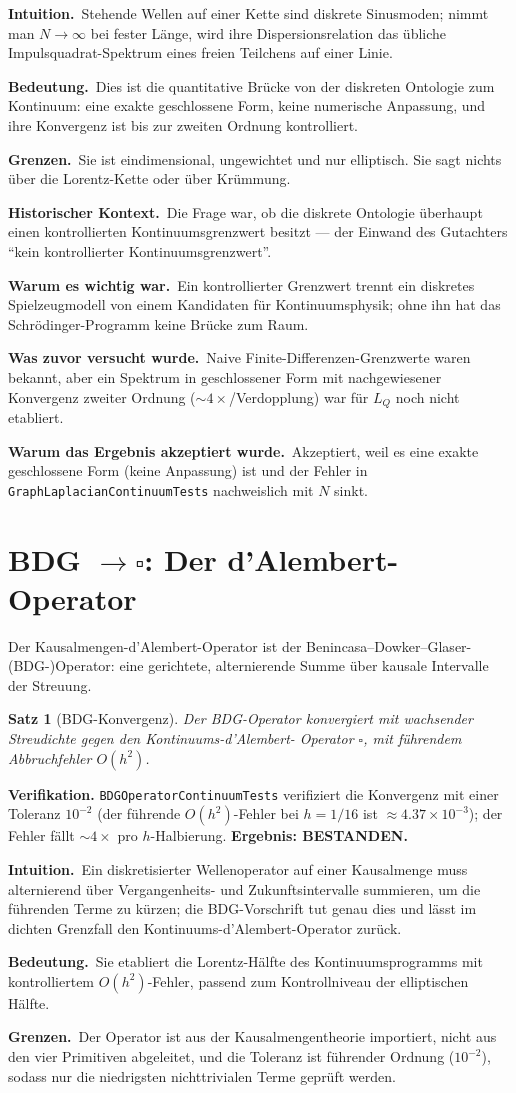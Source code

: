 \documentclass[10pt,twoside,openany]{book}
\newtheorem{theorem}{Satz}[chapter]
\newcommand{\theoremnotes}[3]{%
  \par\medskip\noindent
  \textbf{Intuition.}\ #1\par
  \textbf{Bedeutung.}\ #2\par
  \textbf{Grenzen.}\ #3\par}
\newcommand{\historynotes}[4]{%
  \par\smallskip\noindent
  \textbf{Historischer Kontext.}\ #1\par
  \textbf{Warum es wichtig war.}\ #2\par
  \textbf{Was zuvor versucht wurde.}\ #3\par
  \textbf{Warum das Ergebnis akzeptiert wurde.}\ #4\par}
\begin{document}
\theoremnotes
{Stehende Wellen auf einer Kette sind diskrete Sinusmoden; nimmt man $N\to\infty$ bei
fester Länge, wird ihre Dispersionsrelation das übliche Impulsquadrat-Spektrum eines
freien Teilchens auf einer Linie.}
{Dies ist die quantitative Brücke von der diskreten Ontologie zum Kontinuum: eine exakte
geschlossene Form, keine numerische Anpassung, und ihre Konvergenz ist bis zur zweiten
Ordnung kontrolliert.}
{Sie ist eindimensional, ungewichtet und nur elliptisch. Sie sagt nichts über die
Lorentz-Kette oder über Krümmung.}

\historynotes
{Die Frage war, ob die diskrete Ontologie überhaupt einen kontrollierten
Kontinuumsgrenzwert besitzt --- der Einwand des Gutachters ``kein kontrollierter
Kontinuumsgrenzwert''.}
{Ein kontrollierter Grenzwert trennt ein diskretes Spielzeugmodell von einem Kandidaten
für Kontinuumsphysik; ohne ihn hat das Schr\"odinger-Programm keine Brücke zum Raum.}
{Naive Finite-Differenzen-Grenzwerte waren bekannt, aber ein Spektrum in geschlossener
Form mit nachgewiesener Konvergenz zweiter Ordnung ($\sim4\times$/Verdopplung) war für
$L_Q$ noch nicht etabliert.}
{Akzeptiert, weil es eine exakte geschlossene Form (keine Anpassung) ist und der Fehler in
\texttt{GraphLaplacianContinuumTests} nachweislich mit $N$ sinkt.}

\section{BDG $\to \square$: Der d'Alembert-Operator}
\label{ch:dalembertian}

Der Kausalmengen-d'Alembert-Operator ist der Benincasa--Dowker--Glaser-(BDG-)Operator:
eine gerichtete, alternierende Summe über kausale Intervalle der Streuung.

\begin{theorem}[BDG-Konvergenz]
Der BDG-Operator konvergiert mit wachsender Streudichte gegen den Kontinuums-d'Alembert-
Operator $\square$, mit führendem Abbruchfehler $O(h^2)$.
\end{theorem}

\textbf{Verifikation.} \texttt{BDGOperatorContinuumTests} verifiziert die Konvergenz mit
einer Toleranz $10^{-2}$ (der führende $O(h^2)$-Fehler bei $h=1/16$ ist
$\approx4.37\times10^{-3}$); der Fehler fällt $\sim4\times$ pro $h$-Halbierung.
\textbf{Ergebnis: BESTANDEN.}

\theoremnotes
{Ein diskretisierter Wellenoperator auf einer Kausalmenge muss alternierend über
Vergangenheits- und Zukunftsintervalle summieren, um die führenden Terme zu kürzen; die
BDG-Vorschrift tut genau dies und lässt im dichten Grenzfall den
Kontinuums-d'Alembert-Operator zurück.}
{Sie etabliert die Lorentz-Hälfte des Kontinuumsprogramms mit kontrolliertem
$O(h^2)$-Fehler, passend zum Kontrollniveau der elliptischen Hälfte.}
{Der Operator ist aus der Kausalmengentheorie importiert, nicht aus den vier Primitiven
abgeleitet, und die Toleranz ist führender Ordnung ($10^{-2}$), sodass nur die niedrigsten
nichttrivialen Terme geprüft werden.}
\end{document}
